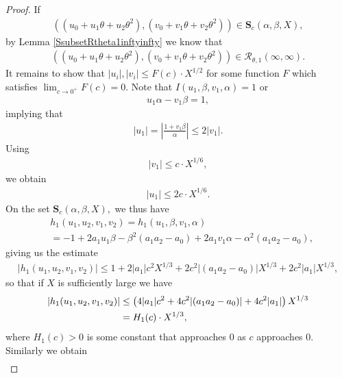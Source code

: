 \documentclass[10pt,a4paper]{amsart}
\begin{document}
\begin{proof}
If
\begin{align*}
((u_{0}+u_{1}\theta+u_{2}\theta^2), (v_{0}+v_{1}\theta+v_{2}\theta^2)) \in \mathbf{S}_{c}(\alpha,\beta,X),
\end{align*}
by Lemma \ref{SsubsetRtheta1inftyinfty} we know that 
\begin{align}
\label{Halfdoneu0u1u2v0v1v2proof}
((u_{0}+u_{1}\theta+u_{2}\theta^2), (v_{0}+v_{1}\theta+v_{2}\theta^2)) \in \mathcal{R}_{\theta,1}(\infty,\infty).
\end{align}
It remains to show that $|u_{i}|,|v_{i}| \leq F(c)\cdot X^{1/2}$ for some function $F$ which satisfies $\lim_{c\rightarrow 0^{+}}F(c) = 0$. Note that $I(u_{1},\beta,v_{1},\alpha) = 1$ or 
\begin{align*}
u_{1}\alpha-v_{1}\beta = 1,
\end{align*}
implying that
\begin{align*}
|u_{1}| = \left|\frac{1+v_{1}\beta}{\alpha}\right| \leq 2 |v_{1}|.
\end{align*}
Using
\begin{align}
\label{v1inequalitysum2squares}
|v_{1}|\leq c\cdot X^{1/6},
\end{align}
we obtain
\begin{align}
\label{u1inequalitysum2squares}
|u_{1}| \leq 2c \cdot X^{1/6}.
\end{align}
On the set $\mathbf{S}_{c}(\alpha,\beta,X),$ we thus have
\begin{align*}
&h_{1}(u_{1},u_{2}, v_{1},v_{2}) = h_{1}(u_{1},\beta, v_{1},\alpha)\\
&= -1+2a_{1}u_{1}\beta-\beta^2(a_{1}a_{2}-a_{0})+2a_{1}v_{1}\alpha-\alpha^2(a_{1}a_{2}-a_{0}),
\end{align*}
giving us the estimate
\begin{align*}
\left|h_{1}(u_{1},u_{2}, v_{1},v_{2})\right| \leq 1+2|a_{1}|c^2 X^{1/3} + 2c^2|(a_{1}a_{2}-a_{0})|X^{1/3}+2c^2|a_{1}|X^{1/3},
\end{align*}
so that if $X$ is sufficiently large we have 
\begin{align}
\label{h1u1u2v1v2inequalitysum2squares}
\left|h_{1}(u_{1},u_{2}, v_{1},v_{2})\right| &\leq \left(4|a_{1}|c^2 + 4c^2|(a_{1}a_{2}-a_{0})|+4c^2|a_{1}|\right)X^{1/3}\notag\\
&= H_{1}(c)\cdot X^{1/3},
\end{align}
where $H_{1}(c)>0$ is some constant that approaches $0$ as $c$ approaches $0$.
Similarly we obtain
\begin{align*}

\end{align*}
\end{proof}
\end{document}

